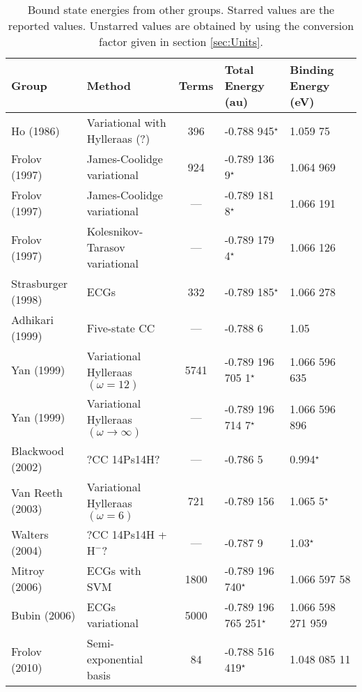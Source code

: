 \documentclass[Dissertation.tex]{subfiles}
\begin{document}
\begin{table}[H]
\begin{center}
\begin{tabular}{l l c l l}
\toprule
Group & Method & Terms & Total Energy (au) & Binding Energy (eV)\\
\midrule
Ho (1986) \cite{Ho1986} & Variational with Hylleraas (?) & 396 & -0.788 945$^\star$ & 1.059 75 \\
Frolov (1997) \cite{Frolov1997a} & James-Coolidge variational & 924 & -0.789 136 9$^\star$ & 1.064 969 \\
Frolov (1997) \cite{Frolov1997a} & James-Coolidge variational & --- & -0.789 181 8$^\star$ & 1.066 191 \\
Frolov (1997) \cite{Frolov1997c} & Kolesnikov-Tarasov variational & --- & -0.789 179 4$^\star$ & 1.066 126 \\
Strasburger (1998) \cite{Strasburger1998} & ECGs & 332 & -0.789 185$^\star$ & 1.066 278 \\
Adhikari (1999) \cite{Adhikari1999} & Five-state CC & --- & -0.788 6 & 1.05 \\
Yan (1999) \cite{Yan1999} & Variational Hylleraas $(\omega = 12)$ & 5741 & -0.789 196 705 1$^\star$ & 1.066 596 635 \\
Yan (1999) \cite{Yan1999} & Variational Hylleraas $(\omega \rightarrow \infty)$ & --- & -0.789 196 714 7$^\star$ & 1.066 596 896 \\
Blackwood (2002) \cite{Blackwood2002} & ?CC 14Ps14H? & --- & -0.786 5 & 0.994$^\star$ \\
Van Reeth (2003) \cite{VanReeth2003} & Variational Hylleraas $(\omega = 6)$ & 721 & -0.789 156 & 1.065 5$^\star$ \\
Walters (2004) \cite{Walters2004} & ?CC 14Ps14H + $\text{H}^-$? & --- & -0.787 9 & 1.03$^\star$\\
Mitroy (2006) \cite{Mitroy2006} & ECGs with SVM & 1800 & -0.789 196 740$^\star$ & 1.066 597 58 \\
Bubin (2006) \cite{Bubin2006} & ECGs variational & 5000 & -0.789 196 765 251$^\star$ & 1.066 598 271 959 \\
Frolov (2010) \cite{Frolov2010} & Semi-exponential basis & 84 & -0.788 516 419$^\star$ & 1.048 085 11 \\
\bottomrule
\end{tabular}
\caption{Bound state energies from other groups. Starred values are the reported values. Unstarred values are obtained by using the conversion factor given in section \ref{sec:Units}.}
\label{tab:BoundEnergyOther}
\end{center}
\end{table}
\end{document}
